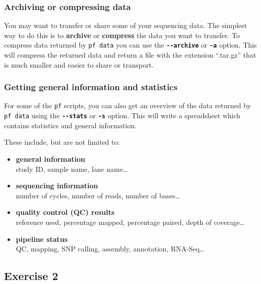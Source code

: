 \documentclass[11pt]{article}
\begin{document}
\hypertarget{archiving-or-compressing-data}{%
\subsubsection{Archiving or compressing
data}\label{archiving-or-compressing-data}}

You may want to transfer or share some of your sequencing data. The
simplest way to do this is to \textbf{archive} or \textbf{compress} the
data you want to transfer. To compress data returned by
\texttt{pf\ data} you can use the \textbf{\texttt{-\/-archive}} or
\textbf{\texttt{-a}} option. This will compress the returned data and
return a file with the extension ``.tar.gz'' that is much smaller and
easier to share or transport.

\hypertarget{getting-general-information-and-statistics}{%
\subsubsection{Getting general information and
statistics}\label{getting-general-information-and-statistics}}

For some of the \texttt{pf} scripts, you can also get an overview of the
data returned by \texttt{pf\ data} using the \textbf{\texttt{-\/-stats}}
or \textbf{\texttt{-s}} option. This will write a spreadsheet which
contains statistics and general information.

These include, but are not limited to:

\begin{itemize}
\item
  \textbf{general information}\\
  study ID, sample name, lane name\ldots{}
\item
  \textbf{sequencing information}\\
  number of cycles, number of reads, number of bases\ldots{}
\item
  \textbf{quality control (QC) results}\\
  reference used, percentage mapped, percentage paired, depth of
  coverage\ldots{}
\item
  \textbf{pipeline status}\\
  QC, mapping, SNP calling, assembly, annotation, RNA-Seq\ldots{}
\end{itemize}

    \hypertarget{exercise-2}{%
\subsection{Exercise 2}\label{exercise-2}}
\end{document}
